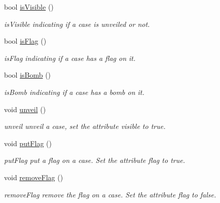 \begin{DoxyCompactItemize}
bool \hyperlink{class_case_a6bf64c2cc2b5ab1ee9f340dde607eda2}{is\+Visible} ()
\begin{DoxyCompactList}\small\item\em is\+Visible indicating if a case is unveiled or not. \end{DoxyCompactList}\item 
bool \hyperlink{class_case_a9fdeaaa245f3af19ea057b93aa2b423d}{is\+Flag} ()
\begin{DoxyCompactList}\small\item\em is\+Flag indicating if a case has a flag on it. \end{DoxyCompactList}\item 
bool \hyperlink{class_case_a40789e3a7a8405f4dc8091d87ac25fd8}{is\+Bomb} ()
\begin{DoxyCompactList}\small\item\em is\+Bomb indicating if a case has a bomb on it. \end{DoxyCompactList}\item 
\mbox{\label{class_case_a6385233b74ac590eead57c153449dff9}} 
void \hyperlink{class_case_a6385233b74ac590eead57c153449dff9}{unveil} ()
\begin{DoxyCompactList}\small\item\em unveil unveil a case, set the attribute visible to true. \end{DoxyCompactList}\item 
\mbox{\label{class_case_a97772ac6e7e0d7e1ad93ba9add4f5508}} 
void \hyperlink{class_case_a97772ac6e7e0d7e1ad93ba9add4f5508}{put\+Flag} ()
\begin{DoxyCompactList}\small\item\em put\+Flag put a flag on a case. Set the attribute flag to true. \end{DoxyCompactList}\item 
\mbox{\label{class_case_aa23ab498f5e079e41d04542dcf8227d6}} 
void \hyperlink{class_case_aa23ab498f5e079e41d04542dcf8227d6}{remove\+Flag} ()
\begin{DoxyCompactList}\small\item\em remove\+Flag remove the flag on a case. Set the attribute flag to false. \end{DoxyCompactList}\item 
\mbox{\label{class_case_a19cc364d79982f30a6201e1624075d7f}} 

\end{DoxyCompactItemize}
